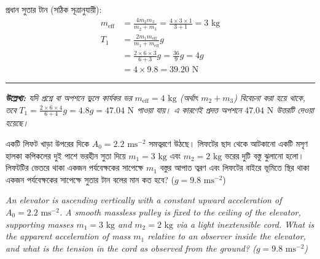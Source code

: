 \documentclass[12pt, a4paper]{article}
\begin{document}
\begin{tcolorbox}[solutionbox={সমাধান (Solution)}]
    প্রধান সুতার টান (সঠিক সূত্রানুযায়ী):
    \begin{align*}
        m_{\text{eff}} &= \frac{4 m_2 m_3}{m_2 + m_3} = \frac{4 \times 3 \times 1}{3 + 1} = 3\text{ kg} \\
        T_1 &= \frac{2 m_1 m_{\text{eff}}}{m_1 + m_{\text{eff}}} g \\
            &= \frac{2 \times 6 \times 3}{6 + 3} g = \frac{36}{9} g = 4g \\
            &= 4 \times 9.8 = \mathbf{39.20}\text{ N}
    \end{align*}
    
    \hrule
    \vspace{0.5em}
    \noindent\textit{\footnotesize \textbf{উল্লেখ্য:} যদি প্রশ্নে বা অপশনে ভুলে কার্যকর ভর $m_{\text{eff}} = 4\text{ kg}$ (অর্থাৎ $m_2+m_3$) বিবেচনা করা হয়ে থাকে, তবে $T_1 = \frac{2 \times 6 \times 4}{6+4}g = 4.8g = 47.04\text{ N}$ পাওয়া যায়। এ কারণেই প্রদত্ত অপশনে $47.04\text{ N}$ উত্তরটি দেওয়া হয়েছে।}
\end{tcolorbox}

\begin{tcolorbox}[questionbox={প্রশ্ন (Question) 9}]
    \noindent
    একটি লিফট খাড়া উপরের দিকে $A_0 = 2.2\text{ ms}^{-2}$ সমত্বরণে উঠছে। লিফটের ছাদ থেকে আটকানো একটি মসৃণ হালকা কপিকলের দুই পাশে ভরহীন সুতা দিয়ে $m_1 = 3\text{ kg}$ এবং $m_2 = 2\text{ kg}$ ভরের দুটি বস্তু ঝুলানো হলো। লিফটটির ভেতরে থাকা একজন পর্যবেক্ষকের সাপেক্ষে $m_1$ বস্তুর আপাত ত্বরণ এবং লিফটের বাইরে ভূমিতে স্থির থাকা একজন পর্যবেক্ষকের সাপেক্ষে সুতার টান বলের মান কত হবে? ($g = 9.8\text{ ms}^{-2}$)
    
    \vspace{0.8em}
    \begin{english}
    \noindent\textit{\color{darkgray}
    An elevator is ascending vertically with a constant upward acceleration of $A_0 = 2.2\text{ ms}^{-2}$. A smooth massless pulley is fixed to the ceiling of the elevator, supporting masses $m_1 = 3\text{ kg}$ and $m_2 = 2\text{ kg}$ via a light inextensible cord. What is the apparent acceleration of mass $m_1$ relative to an observer inside the elevator, and what is the tension in the cord as observed from the ground? ($g = 9.8\text{ ms}^{-2}$)
    }
    \end{english}
\end{tcolorbox}
\end{document}
